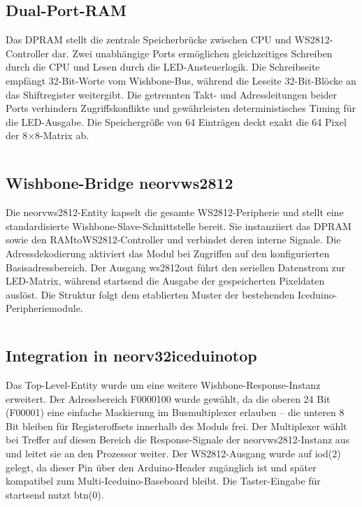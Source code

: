 \subsection{Dual-Port-RAM}

Das DPRAM stellt die zentrale Speicherbrücke zwischen CPU und 
WS2812-Controller dar. Zwei unabhängige Ports ermöglichen gleichzeitiges 
Schreiben durch die CPU und Lesen durch die LED-Ansteuerlogik. Die 
Schreibseite empfängt 32-Bit-Worte vom Wishbone-Bus, während die 
Leseite 32-Bit-Blöcke an das Shiftregister weitergibt. Die getrennten 
Takt- und Adressleitungen beider Ports verhindern Zugriffskonflikte und 
gewährleisten deterministisches Timing für die LED-Ausgabe. Die 
Speichergröße von 64 Einträgen deckt exakt die 64 Pixel der 8×8-Matrix ab.

\inputminted[linenos,frame=single,fontsize=\footnotesize]{vhdl}{A9_Abgabe/iceduino_setup/osflow/boards/iceduino/ram.vhd}


\subsection{Wishbone-Bridge neorv\textunderscore ws2812}

Die neorv\textunderscore ws2812-Entity kapselt die gesamte WS2812-Peripherie und stellt 
eine standardisierte Wishbone-Slave-Schnittstelle bereit. Sie instanziiert 
das DPRAM sowie den RAMtoWS2812-Controller und verbindet deren interne Signale. 
Die Adressdekodierung aktiviert das Modul bei Zugriffen auf den konfigurierten 
Basisadressbereich. Der Ausgang ws2812\textunderscore out führt den seriellen Datenstrom zur 
LED-Matrix, während start\textunderscore send die Ausgabe der gespeicherten Pixeldaten auslöst. 
Die Struktur folgt dem etablierten Muster der bestehenden Iceduino-Peripheriemodule.

\inputminted[linenos,frame=single,fontsize=\footnotesize]{vhdl}{A9_Abgabe/iceduino_setup/osflow/boards/iceduino/neorv_ws2812.vhd}


\subsection{Integration in neorv32\textunderscore iceduino\textunderscore top}

Das Top-Level-Entity wurde um eine weitere Wishbone-Response-Instanz erweitert. 
Der Adressbereich F0000100 wurde gewählt, da die oberen 24 Bit (F00001) eine einfache 
Maskierung im Busmultiplexer erlauben – die unteren 8 Bit bleiben für Registeroffsets 
innerhalb des Moduls frei. Der Multiplexer wählt bei Treffer auf diesen Bereich die 
Response-Signale der neorv\textunderscore ws2812-Instanz aus und leitet sie an den Prozessor weiter. 
Der WS2812-Ausgang wurde auf io\textunderscore d(2) gelegt, da dieser Pin über den Arduino-Header 
zugänglich ist und später kompatibel zum Multi-Iceduino-Baseboard bleibt. Die 
Taster-Eingabe für start\textunderscore send nutzt btn(0).

